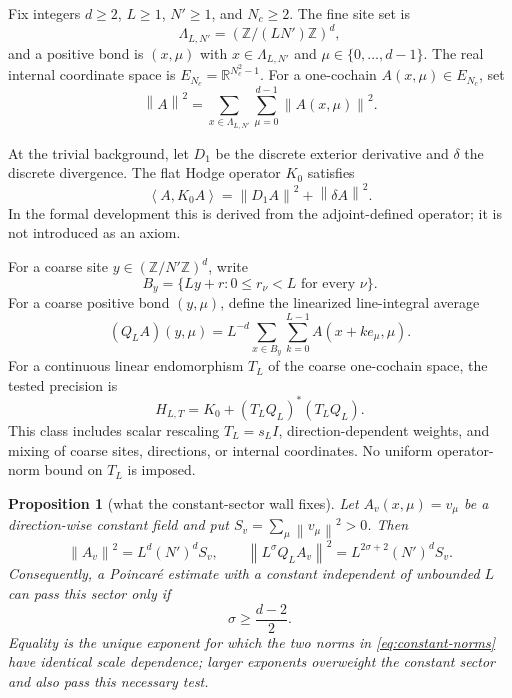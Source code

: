 \documentclass[11pt]{article}
\newtheorem{proposition}[theorem]{Proposition}
\theoremstyle{definition}
\newcommand{\R}{\mathbb{R}}
\newcommand{\Z}{\mathbb{Z}}
\newcommand{\ip}[2]{\left\langle #1,#2\right\rangle}
\newcommand{\norm}[1]{\left\lVert #1\right\rVert}
\begin{document}
Fix integers $d\ge2$, $L\ge1$, $N'\ge1$, and $N_c\ge2$.  The fine site set is
\[
 \Lambda_{L,N'}=\left(\Z/(LN')\Z\right)^d,
\]
and a positive bond is $(x,\mu)$ with $x\in\Lambda_{L,N'}$ and
$\mu\in\{0,\ldots,d-1\}$.  The real internal coordinate space is
$E_{N_c}=\R^{N_c^2-1}$.  For a one-cochain $A(x,\mu)\in E_{N_c}$, set
\[
 \norm{A}^2=\sum_{x\in\Lambda_{L,N'}}\sum_{\mu=0}^{d-1}
 \norm{A(x,\mu)}^2.
\]

At the trivial background, let $D_1$ be the discrete exterior derivative and
$\delta$ the discrete divergence.  The flat Hodge operator $K_0$ satisfies
\begin{equation}\label{eq:hodge}
 \ip{A}{K_0A}=\norm{D_1A}^2+\norm{\delta A}^2.
\end{equation}
In the formal development this is derived from the adjoint-defined operator;
it is not introduced as an axiom.

For a coarse site $y\in(\Z/N'\Z)^d$, write
\[
 B_y=\{Ly+r:0\le r_\nu<L\text{ for every }\nu\}.
\]
For a coarse positive bond $(y,\mu)$, define the linearized line-integral
average
\begin{equation}\label{eq:Q}
 (Q_LA)(y,\mu)=L^{-d}\sum_{x\in B_y}\sum_{k=0}^{L-1}
 A(x+ke_\mu,\mu).
\end{equation}
For a continuous linear endomorphism $T_L$ of the coarse one-cochain space,
the tested precision is
\begin{equation}\label{eq:H}
 H_{L,T}=K_0+(T_LQ_L)^*(T_LQ_L).
\end{equation}
This class includes scalar rescaling $T_L=s_LI$, direction-dependent weights,
and mixing of coarse sites, directions, or internal coordinates.  No uniform
operator-norm bound on $T_L$ is imposed.

\begin{proposition}[what the constant-sector wall fixes]
\label{prop:critical-exponent}
Let $A_v(x,\mu)=v_\mu$ be a direction-wise constant field and put
$S_v=\sum_\mu\norm{v_\mu}^2>0$.  Then
\begin{equation}\label{eq:constant-norms}
 \norm{A_v}^2=L^d(N')^dS_v,
 \qquad
 \norm{L^\sigma Q_LA_v}^2=L^{2\sigma+2}(N')^dS_v.
\end{equation}
Consequently, a Poincar\'e estimate with a constant independent of unbounded
$L$ can pass this sector only if
\begin{equation}\label{eq:critical-threshold}
 \sigma\ge\frac{d-2}{2}.
\end{equation}
Equality is the unique exponent for which the two norms in
\eqref{eq:constant-norms} have identical scale dependence; larger exponents
overweight the constant sector and also pass this necessary test.
\end{proposition}
\end{document}
